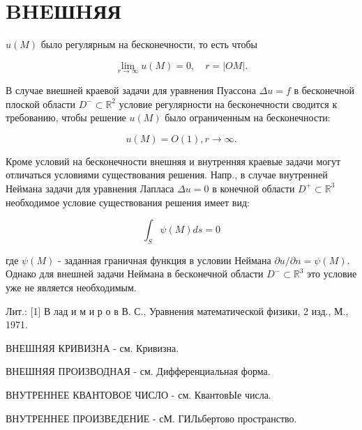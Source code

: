 \documentclass[10pt]{article}
\begin{document}
\section{BHEШHЯЯ}

$u(M)$ было регулярным на бесконечности, то есть чтобы



\[

\lim _{r \rightarrow \infty} u(M)=0, \quad r=|O M| .

\]



В случае внешней краевой задачи для уравнения Пуассона $\Delta u=f$ в бесконечной плоской области $D^{-} \subset \mathbb{R}^{2}$ условие регулярности на бесконечности сводится к требованию, чтобы решение $u(M)$ было ограниченным на бесконечности:



\[

u(M)=O(1), r \rightarrow \infty .

\]



Кроме условий на бесконечности внешняя и внутренняя краевые задачи могут отличаться условиями существования решения. Напр., в случае внутренней Неймана задачи для уравнения Лапласа $\Delta u=0$ в конечной области $D^{+} \subset \mathbb{R}^{3}$ необходимое условие существования решения имеет вид:



\[

\int_{S} \psi(M) d s=0

\]



где $\psi(M)$ - заданная граничная функция в условии Неймана $\partial u / \partial n=\psi(M)$. Однако для внешней задачи Неймана в бесконечной области $D^{-} \subset \mathbb{R}^{3}$ это условие уже не является необходимым.



Лит.: [1] В лад и м и р о в В. С., Уравнения математической физики, 2 изд., М., 1971.



ВНЕШНЯЯ КРИВИЗНА - см. Кривизна.



ВНЕШНЯЯ ПРОИЗВОДНАЯ - см. Дифференциальная форма.



ВНУТРЕННЕЕ КВАНТОВОЕ ЧИСЛО - см. КвантовЫе числа.



ВНУТРЕННЕЕ ПРОИЗВЕДЕНИЕ - сМ. ГИЛьбертово пространство.
\end{document}
